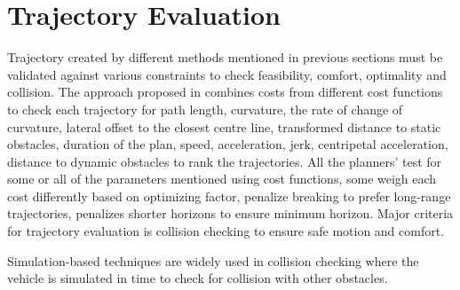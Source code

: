 \section{Trajectory Evaluation}
\label{traj_eval}
Trajectory created by different methods mentioned in previous sections must be validated against various constraints to check feasibility, comfort, optimality and collision. The approach proposed in \cite{traj_planner_optimization} combines costs from different cost functions to check each trajectory for path length, curvature, the rate of change of curvature, lateral offset to the closest centre line, transformed distance to static obstacles, duration of the plan, speed, acceleration, jerk, centripetal acceleration, distance to dynamic obstacles to rank the trajectories. All the planners' test for some or all of the parameters mentioned using cost functions, some weigh each cost differently based on optimizing factor, \cite{unit_A_star} penalize breaking to prefer long-range trajectories, \cite{cmu_parallel_thesis} penalizes shorter horizons to ensure minimum horizon. Major criteria for trajectory evaluation is collision checking to ensure safe motion and comfort.

Simulation-based techniques are widely used in collision checking where the vehicle is simulated in time to check for collision with other obstacles.

